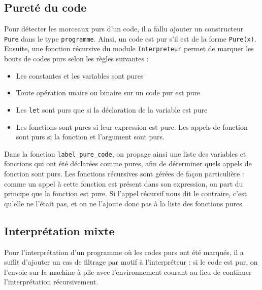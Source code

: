 \subsection{Pureté du code}
Pour détecter les morceaux purs d'un code, il a fallu ajouter un constructeur \texttt{Pure} dans le type \texttt{programme}. Ainsi, un code est pur s'il est de la forme \texttt{Pure(x)}. \\
Ensuite, une fonction récursive du module \texttt{Interpreteur} permet de marquer les bouts de codes purs selon les règles suivantes :
\begin{itemize}
 \item Les constantes et les variables sont pures
 \item Toute opération unaire ou binaire sur un code pur est pure
 \item Les \texttt{let} sont purs que si la déclaration de la variable est pure
 \item Les fonctions sont pures si leur expression est pure. Les appels de fonction sont purs si la fonction et l'argument sont purs.
\end{itemize}
Dans la fonction \texttt{label\_pure\_code}, on propage ainsi une liste des variables et fonctions qui ont été déclarées comme pures, afin de déterminer quels appels de fonction sont purs. Les fonctions récursives sont gérées de façon particulière : comme un appel à cette fonction est présent dans son expression, on part du principe que la fonction est pure. Si l'appel récursif nous dit le contraire, c'est qu'elle ne l'était pas, et on ne l'ajoute donc pas à la liste des fonctions pures.

\subsection{Interprétation mixte}

Pour l'interprétation d'un programme où les codes purs ont été marqués, il a suffit d'ajouter un cas de filtrage par motif à l'interpréteur : si le code est pur, on l'envoie sur la machine à pile avec l'environnement courant au lieu de continuer l'interprétation récursivement.
